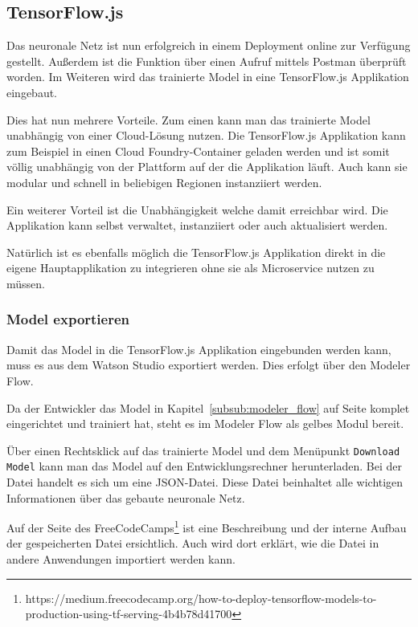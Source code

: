 \subsection{TensorFlow.js}
Das neuronale Netz ist nun erfolgreich in einem Deployment online zur Verfügung gestellt. Außerdem ist die Funktion
über einen Aufruf mittels Postman überprüft worden. Im Weiteren wird das trainierte Model in eine TensorFlow.js
Applikation eingebaut.

Dies hat nun mehrere Vorteile. Zum einen kann man das trainierte Model unabhängig von einer Cloud-Lösung nutzen. Die
TensorFlow.js Applikation kann zum Beispiel in einen Cloud Foundry-Container geladen werden und ist somit völlig
unabhängig von der Plattform auf der die Applikation läuft. Auch kann sie modular und schnell in beliebigen Regionen
instanziiert werden.

Ein weiterer Vorteil ist die Unabhängigkeit welche damit erreichbar wird. Die Applikation kann selbst verwaltet,
instanziiert oder auch aktualisiert werden.

Natürlich ist es ebenfalls möglich die TensorFlow.js Applikation direkt in die eigene Hauptapplikation zu integrieren
ohne sie als Microservice nutzen zu müssen.

\subsubsection{Model exportieren}
Damit das Model in die TensorFlow.js Applikation eingebunden werden kann, muss es aus dem Watson Studio exportiert
werden.
Dies erfolgt über den Modeler Flow.

Da der Entwickler das Model in Kapitel~\ref{subsub:modeler_flow} auf Seite\pageref{subsub:modeler_flow} komplet
eingerichtet und trainiert hat, steht es im Modeler Flow als gelbes Modul bereit.

Über einen Rechtsklick auf das trainierte Model und dem Menüpunkt \texttt{Download Model} kann man das Model auf den
Entwicklungsrechner herunterladen. Bei der Datei handelt es sich um eine JSON-Datei. Diese Datei beinhaltet alle wichtigen
Informationen über das gebaute neuronale Netz.

Auf der Seite des
FreeCodeCamps\footnote{https://medium.freecodecamp.org/how-to-deploy-tensorflow-models-to-production-using-tf-serving-4b4b78d41700}
ist eine Beschreibung und der interne Aufbau der gespeicherten Datei ersichtlich. Auch wird dort erklärt, wie die Datei
in andere Anwendungen importiert werden kann.

